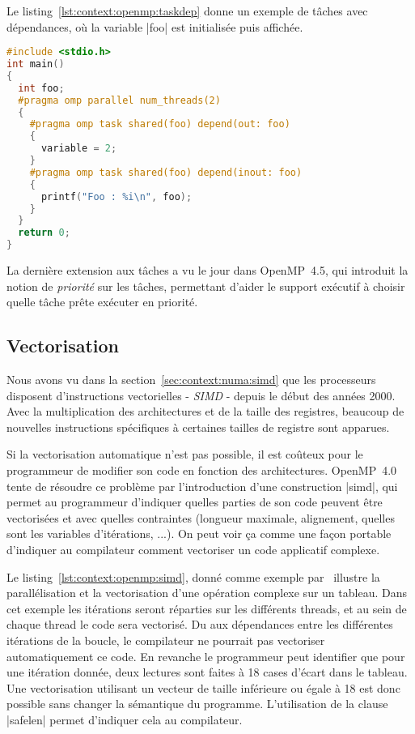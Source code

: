 Le listing~\ref{lst:context:openmp:taskdep} donne un exemple de tâches avec dépendances, où la variable |foo| est initialisée puis affichée.

\begin{lstlisting}[language=c++,caption=Exemple de tâches avec dépendances,label=lst:context:openmp:taskdep]
#include <stdio.h>
int main()
{
  int foo;
  #pragma omp parallel num_threads(2)
  {
    #pragma omp task shared(foo) depend(out: foo)
    {
      variable = 2;
    }
    #pragma omp task shared(foo) depend(inout: foo)
    {
      printf("Foo : %i\n", foo);
    }
  }
  return 0;
}
\end{lstlisting}

La dernière extension aux tâches a vu le jour dans OpenMP~4.5, qui introduit la notion de \emph{priorité} sur les tâches, permettant d'aider le support exécutif à choisir quelle tâche prête exécuter en priorité.

\subsection{Vectorisation}

Nous avons vu dans la section~\ref{sec:context:numa:simd} que les processeurs disposent d'instructions vectorielles - \emph{SIMD} - depuis le début des années 2000.
Avec la multiplication des architectures et de la taille des registres, beaucoup de nouvelles instructions spécifiques à certaines tailles de registre sont apparues.

Si la vectorisation automatique n'est pas possible, il est coûteux pour le programmeur de modifier son code en fonction des architectures.
OpenMP~4.0 tente de résoudre ce problème par l'introduction d'une construction |simd|, qui permet au programmeur d'indiquer quelles parties de son code peuvent être vectorisées et avec quelles contraintes (longueur maximale, alignement, quelles sont les variables d'itérations, ...).
On peut voir ça comme une façon portable d'indiquer au compilateur comment vectoriser un code applicatif complexe.

Le listing~\ref{lst:context:openmp:simd}, donné comme exemple par~\cite{HPCToday} illustre la parallélisation et la vectorisation d'une opération complexe sur un tableau.
Dans cet exemple les itérations seront réparties sur les différents threads, et au sein de chaque thread le code sera vectorisé.
Du aux dépendances entre les différentes itérations de la boucle, le compilateur ne pourrait pas vectoriser automatiquement ce code.
En revanche le programmeur peut identifier que pour une itération donnée, deux lectures sont faites à 18 cases d'écart dans le tableau. Une vectorisation utilisant un vecteur de taille inférieure ou égale à 18 est donc possible sans changer la sémantique du programme.
L'utilisation de la clause |safelen| permet d'indiquer cela au compilateur.


